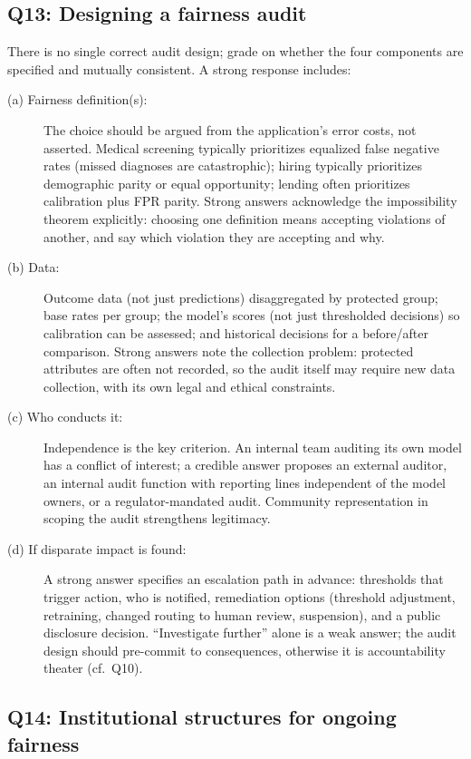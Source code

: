 \subsection*{Q13: Designing a fairness audit}

There is no single correct audit design; grade on whether the four components are specified and mutually consistent. A strong response includes:

\begin{description}
    \item[(a) Fairness definition(s):] The choice should be argued from the application's error costs, not asserted. Medical screening typically prioritizes equalized false negative rates (missed diagnoses are catastrophic); hiring typically prioritizes demographic parity or equal opportunity; lending often prioritizes calibration plus FPR parity. Strong answers acknowledge the impossibility theorem explicitly: choosing one definition means accepting violations of another, and say which violation they are accepting and why.
    \item[(b) Data:] Outcome data (not just predictions) disaggregated by protected group; base rates per group; the model's scores (not just thresholded decisions) so calibration can be assessed; and historical decisions for a before/after comparison. Strong answers note the collection problem: protected attributes are often not recorded, so the audit itself may require new data collection, with its own legal and ethical constraints.
    \item[(c) Who conducts it:] Independence is the key criterion. An internal team auditing its own model has a conflict of interest; a credible answer proposes an external auditor, an internal audit function with reporting lines independent of the model owners, or a regulator-mandated audit. Community representation in scoping the audit strengthens legitimacy.
    \item[(d) If disparate impact is found:] A strong answer specifies an escalation path in advance: thresholds that trigger action, who is notified, remediation options (threshold adjustment, retraining, changed routing to human review, suspension), and a public disclosure decision. ``Investigate further'' alone is a weak answer; the audit design should pre-commit to consequences, otherwise it is accountability theater (cf.~Q10).
\end{description}

\subsection*{Q14: Institutional structures for ongoing fairness}

